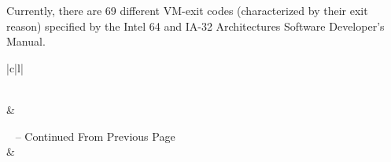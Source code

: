 \documentclass{report}
\begin{document}
\begin{spacing}{1.5}
{\begin{longtable}{|c|}
\end{longtable}
\leavevmode\newline
\newline
}


{\large
Currently, there are 69 different VM-exit codes (characterized by their exit reason) specified by the Intel 64 and IA-32 Architectures Software Developer’s Manual.
\newline
}


\begin{longtable}{|c|l|}
\caption{Intel VMX Defined VM-Exits} \label{tab:long} \\

\hline {} &  \\ \hline 
\endfirsthead

%
{{\tablename\ \thetable{} -- Continued From Previous Page}} \\
\hline {} &  \\ \hline 
\endhead

\hline {} \\ \hline
\endfoot

\hline \hline
\endlastfoot


\end{longtable}
\end{spacing}
\end{document}
